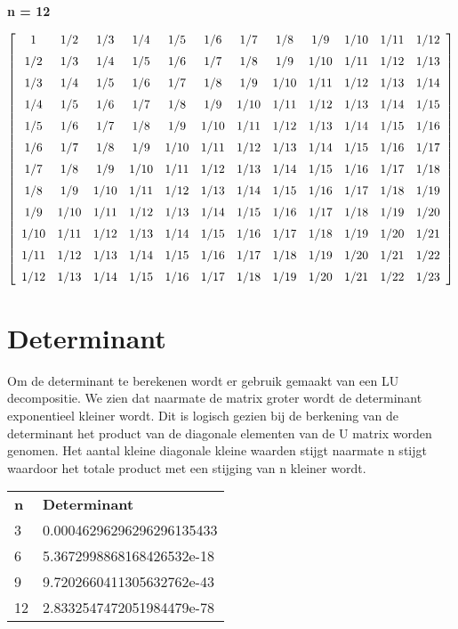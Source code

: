 \documentclass[10pt,a4paper]{article}
\begin{document}
\begin{center}
\textbf{n = 12}
\end{center}
$$  \left[ \begin {array}{cccccccccccc} 1&1/2&1/3&1/4&1/5&1/6&1/7&1/8&1/9
&1/10&1/11&1/12\\ \noalign{\medskip}1/2&1/3&1/4&1/5&1/6&1/7&1/8&1/9&1/
10&1/11&1/12&1/13\\ \noalign{\medskip}1/3&1/4&1/5&1/6&1/7&1/8&1/9&1/10
&1/11&1/12&1/13&1/14\\ \noalign{\medskip}1/4&1/5&1/6&1/7&1/8&1/9&1/10&
1/11&1/12&1/13&1/14&1/15\\ \noalign{\medskip}1/5&1/6&1/7&1/8&1/9&1/10&
1/11&1/12&1/13&1/14&1/15&1/16\\ \noalign{\medskip}1/6&1/7&1/8&1/9&1/10
&1/11&1/12&1/13&1/14&1/15&1/16&1/17\\ \noalign{\medskip}1/7&1/8&1/9&1/
10&1/11&1/12&1/13&1/14&1/15&1/16&1/17&1/18\\ \noalign{\medskip}1/8&1/9
&1/10&1/11&1/12&1/13&1/14&1/15&1/16&1/17&1/18&1/19
\\ \noalign{\medskip}1/9&1/10&1/11&1/12&1/13&1/14&1/15&1/16&1/17&1/18&
1/19&1/20\\ \noalign{\medskip}1/10&1/11&1/12&1/13&1/14&1/15&1/16&1/17&
1/18&1/19&1/20&1/21\\ \noalign{\medskip}1/11&1/12&1/13&1/14&1/15&1/16&
1/17&1/18&1/19&1/20&1/21&1/22\\ \noalign{\medskip}1/12&1/13&1/14&1/15&
1/16&1/17&1/18&1/19&1/20&1/21&1/22&1/23\end {array} \right] 
$$
\section{Determinant}
Om de determinant te berekenen wordt er gebruik gemaakt van een LU decompositie. We zien dat naarmate de matrix groter wordt de determinant exponentieel kleiner wordt. Dit is logisch gezien bij de berkening van de determinant het product van de diagonale elementen van de U matrix worden genomen. Het aantal kleine diagonale kleine waarden stijgt naarmate n stijgt waardoor het totale product met een stijging van n kleiner wordt.
\begin{center}
\begin{tabular}{ll}
\textbf{n} & \textbf{Determinant} \\
3          & 0.00046296296296296135433            \\
6          & 5.3672998868168426532e-18            \\
9          & 9.7202660411305632762e-43             \\
12         & 2.8332547472051984479e-78           
\end{tabular}
\end{center}
\end{document}
